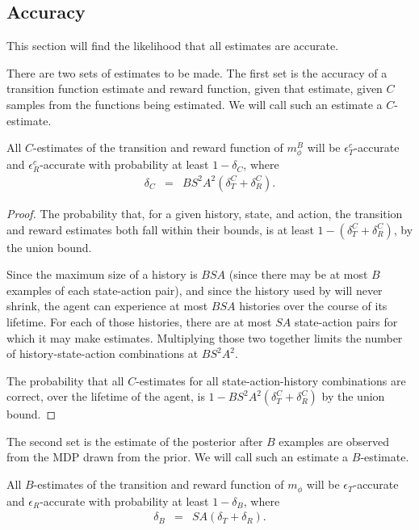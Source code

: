 \subsection{Accuracy}

This section will find the likelihood that all estimates are accurate.

There are two sets of estimates to be made. The first set is the accuracy of a transition function estimate and reward function, given that estimate, given $C$ samples from the functions being estimated. We will call such an estimate a $C$-estimate.

\begin{lemma}
All $C$-estimates of the transition and reward function of $m_\phi^B$ will be $\epsilon_T^c$-accurate and $\epsilon_R^c$-accurate with probability at least $1-\delta_C$, where
\begin{eqnarray}
\delta_C &=& BS^2A^2(\delta_T^C+\delta_R^C).
\end{eqnarray}
\end{lemma}

\begin{proof}
The probability that, for a given history, state, and action, the transition and reward estimates both fall within their bounds, is at least $1-(\delta_T^C+\delta_R^C)$, by the union bound.

Since the maximum size of a history is $B S A$ (since there may be at most $B$ examples of each state-action pair), and since the history used by  will never shrink, the agent can experience at most $BSA$ histories over the course of its lifetime. For each of those histories, there are at most $SA$ state-action pairs for which it may make estimates. Multiplying those two together limits the number of history-state-action combinations at $B S^2 A^2$.

The probability that all $C$-estimates for all state-action-history combinations are correct, over the lifetime of the agent, is $1-BS^2A^2(\delta_T^C+\delta_R^C)$ by the union bound.
\end{proof}

The second set is the estimate of the posterior after $B$ examples are observed from the MDP drawn from the prior. We will call such an estimate a $B$-estimate.

\begin{lemma}
All $B$-estimates of the transition and reward function of $m_\phi$ will be $\epsilon_T$-accurate and $\epsilon_R$-accurate with probability at least $1-\delta_B$, where
\begin{eqnarray}
\delta_B &=& SA(\delta_T+\delta_R).
\end{eqnarray}
\end{lemma}

